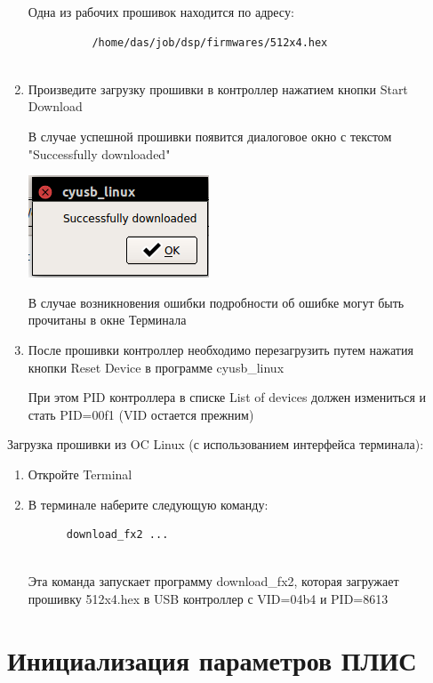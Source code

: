 \documentclass[]{article}
\begin{document}
\begin{enumerate}
  Одна из рабочих прошивок находится по адресу:

\begin{verbatim}
          /home/das/job/dsp/firmwares/512x4.hex
        
\end{verbatim}
\item
  Произведите загрузку прошивки в контроллер нажатием кнопки Start
  Download

  В случае успешной прошивки появится диалоговое окно с текстом
  "Successfully downloaded"

  \includegraphics{./imgs/firmware_USB_lin_Success.png}

  В случае возникновения ошибки подробности об ошибке могут быть
  прочитаны в окне Терминала
\item
  После прошивки контроллер необходимо перезагрузить путем нажатия
  кнопки Reset Device в программе cyusb\_linux

  При этом PID контроллера в списке List of devices должен измениться и
  стать PID=00f1 (VID остается прежним)
\end{enumerate}

Загрузка прошивки из OC Linux (с использованием интерфейса терминала):

\begin{enumerate}
\def\labelenumi{\arabic{enumi}.}
\item
  Откройте Terminal
\item
  В терминале наберите следующую команду:

\begin{verbatim}
      download_fx2 ...
    
\end{verbatim}

  Эта команда запускает программу download\_fx2, которая загружает
  прошивку 512x4.hex в USB контроллер с VID=04b4 и PID=8613
\end{enumerate}

\section{Инициализация параметров ПЛИС}
\end{document}
